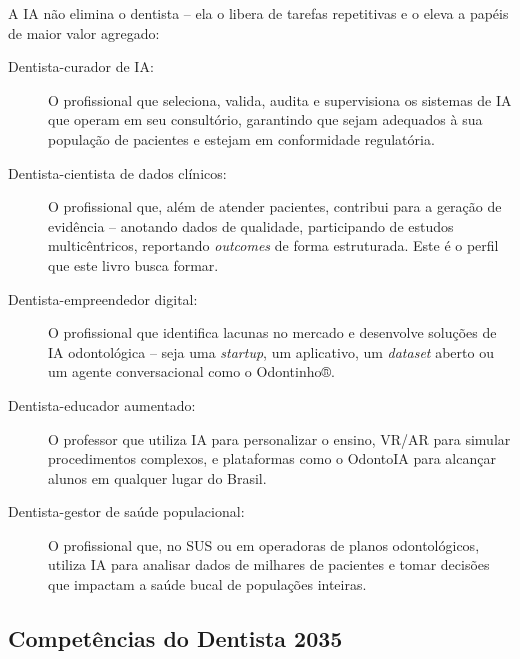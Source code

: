 A IA não elimina o dentista -- ela o libera de tarefas repetitivas e o eleva a
papéis de maior valor agregado:

\begin{description}
  \item[Dentista-curador de IA:] O profissional que seleciona, valida,
    audita e supervisiona os sistemas de IA que operam em seu consultório,
    garantindo que sejam adequados à sua população de pacientes e estejam em
    conformidade regulatória.

  \item[Dentista-cientista de dados clínicos:] O profissional que, além de
    atender pacientes, contribui para a geração de evidência -- anotando
    dados de qualidade, participando de estudos multicêntricos, reportando
    \textit{outcomes} de forma estruturada. Este é o perfil que este livro
    busca formar.

  \item[Dentista-empreendedor digital:] O profissional que identifica lacunas
    no mercado e desenvolve soluções de IA odontológica -- seja uma \textit{
    startup}, um aplicativo, um \textit{dataset} aberto ou um agente
    conversacional como o Odontinho®.

  \item[Dentista-educador aumentado:] O professor que utiliza IA para
    personalizar o ensino, VR/AR para simular procedimentos complexos, e
    plataformas como o OdontoIA para alcançar alunos em qualquer lugar do
    Brasil.

  \item[Dentista-gestor de saúde populacional:] O profissional que, no SUS ou
    em operadoras de planos odontológicos, utiliza IA para analisar dados de
    milhares de pacientes e tomar decisões que impactam a saúde bucal de
    populações inteiras.
\end{description}

\subsection{Competências do Dentista 2035}

